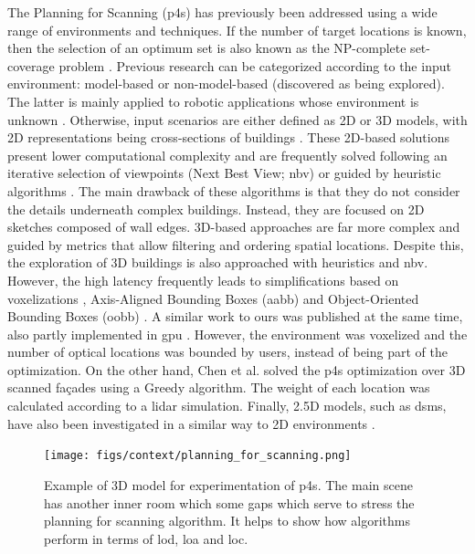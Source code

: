 The Planning for Scanning (\acrshort{p4s}) has previously been addressed using a wide range of environments and techniques. If the number of target locations is known, then the selection of an optimum set is also known as the NP-complete set-coverage problem \cite{li_probability_2021, mohamadi_efficient_2021, roostapour_pareto_2022}. Previous research can be categorized according to the input environment: model-based or non-model-based (discovered as being explored). The latter is mainly applied to robotic applications whose environment is unknown \cite{potthast_probabilistic_2014}. Otherwise, input scenarios are either defined as 2D or 3D models, with 2D representations being cross-sections of buildings \cite{giorgini_sensor-based_2019}. These 2D-based solutions present lower computational complexity and are frequently solved following an iterative selection of viewpoints (Next Best View; \acrshort{nbv}) or guided by heuristic algorithms \cite{aryan_planning_2021}. The main drawback of these algorithms is that they do not consider the details underneath complex buildings. Instead, they are focused on 2D sketches composed of wall edges. 3D-based approaches are far more complex and guided by metrics that allow filtering and ordering spatial locations. Despite this, the exploration of 3D buildings is also approached with heuristics and \acrshort{nbv}. However, the high latency frequently leads to simplifications based on voxelizations \cite{wakisaka_optimal_2019, rougeron_optimal_2022}, Axis-Aligned Bounding Boxes (\acrshort{aabb}) and Object-Oriented Bounding Boxes (\acrshort{oobb}) \cite{li_3d_2022}. A similar work to ours was published at the same time, also partly implemented in \acrshort{gpu} \cite{rougeron_optimal_2022}. However, the environment was voxelized and the number of optical locations was bounded by users, instead of being part of the optimization. On the other hand, Chen et al. \cite{chen_3d_2022} solved the \acrshort{p4s} optimization over 3D scanned façades using a Greedy algorithm. The weight of each location was calculated according to a \acrshort{lidar} simulation. Finally, 2.5D models, such as \acrshort{dsm}s, have also been investigated in a similar way to 2D environments \cite{starek_viewshed_2020}.

\begin{figure}[ht]
	\texttt{[image: figs/context/planning\_for\_scanning.png]}
	\caption{Example of 3D model for experimentation of \acrshort{p4s}. The main scene has another inner room which some gaps which serve to stress the planning for scanning algorithm. It helps to show how algorithms perform in terms of \acrshort{lod}, \acrshort{loa} and \acrshort{loc}.}
    \label{fig:planning_for_scanning_room}
\end{figure}

